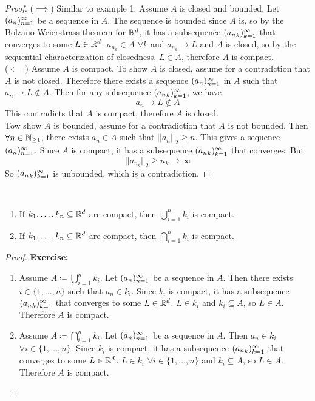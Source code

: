 \documentclass[openany]{report}
\begin{document}
\begin{proof}
    ($\implies$) Similar to example 1. Assume $A$ is closed and bounded. Let $({a}_n)_{n=1}^\infty$ be a sequence in $A$.
    The sequence is bounded since $A$ is, so by the Bolzano-Weierstrass theorem for $\mathbb{R}^d$, it has a subsequence $({a_n}_{k})^{\infty}_{k = 1}$ that converges to some $L \in \mathbb{R}^d$. $a_{n_k} \in A$ $\forall k$ and $a_{n_k} \rightarrow L$ and $A$ is closed, so by the sequential characterization of closedness, $L \in A$, therefore $A$ is compact.\\[2ex]
    ($\impliedby$) Assume $A$ is compact. To show $A$ is closed, assume for a contradction that $A$ is not closed. Therefore there exists a sequence $({a}_{n})^{\infty}_{n = 1}$ in $A$ such that $a_n \rightarrow L\not\in A$. Then for any subsequence $({a_n}_{k})^{\infty}_{k = 1}$, we have 
    $$a_n \rightarrow L \not\in A$$
    This contradicts that $A$ is compact, therefore $A$ is closed. \\[1ex]
    Tow show $A$ is bounded, assume for a contradiction that $A$ is not bounded. Then $\forall n \in \mathbb{N}_{\geq1}$, there exists $a_n \in A$ such that $||a_n||_2 \geq n$. This gives a sequence $({a}_{n})^{\infty}_{n = 1}$. Since $A$ is compact, it has a subsequence $({a_n}_{k})^{\infty}_{k = 1}$ that converges. But 
    \[||a_{n_k}||_2 \geq n_k \rightarrow \infty\]
    So $({a_n}_{k})^{\infty}_{k = 1}$ is unbounded, which is a contradiction.
\end{proof}
\begin{prop}
~\newline
    \begin{enumerate}[label=(\roman*)]
        \item If $k_1, \ldots, k_n \subseteq \mathbb{R}^d$ are compact, then $\bigcup_{i=1}^n k_i$ is compact.
        \item If $k_1, \ldots, k_n \subseteq \mathbb{R}^d$ are compact, then $\bigcap_{i=1}^n k_i$ is compact.
    \end{enumerate}
\end{prop}
\begin{proof}
    \textbf{Exercise:}
    \begin{enumerate}[label=(\roman*)]
        \item Assume $A \coloneqq \bigcup_{i=1}^n k_i$. Let $({a}_n)_{n=1}^\infty$ be a sequence in $A$. Then there exists $i \in \{1, \ldots, n\}$ such that $a_n \in k_i$. Since $k_i$ is compact, it has a subsequence $({a_n}_{k})^{\infty}_{k = 1}$ that converges to some $L \in \mathbb{R}^d$. $L \in k_i$ and $k_i \subseteq A$, so $L \in A$. Therefore $A$ is compact.\\[2ex]
        \item Assume $A \coloneqq \bigcap_{i=1}^n k_i$. Let $({a}_n)_{n=1}^\infty$ be a sequence in $A$. Then $a_n \in k_i$ $\forall i \in \{1, \ldots, n\}$. Since $k_i$ is compact, it has a subsequence $({a_n}_{k})^{\infty}_{k = 1}$ that converges to some $L \in \mathbb{R}^d$. $L \in k_i$ $\forall i \in \{1, \ldots, n\}$ and $k_i \subseteq A$, so $L \in A$. Therefore $A$ is compact.
    \end{enumerate}
\end{proof}
\end{document}
